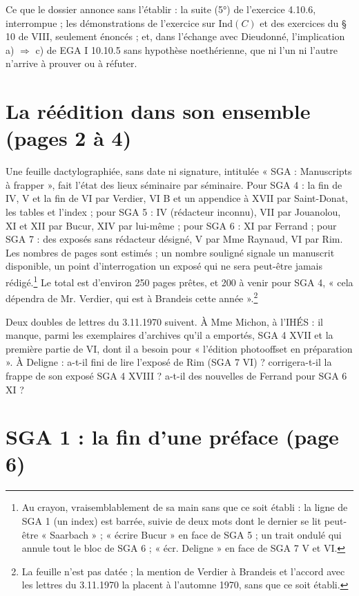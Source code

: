 \documentclass[11pt,a4paper]{article}
\begin{document}
Ce que le dossier annonce sans l'établir : la suite (5°) de l'exercice
4.10.6, interrompue ; les démonstrations de l'exercice sur $\mathrm{Ind}(C)$
et des exercices du § 10 de VIII, seulement énoncés ; et, dans l'échange avec
Dieudonné, l'implication a) $\Rightarrow$ c) de EGA I 10.10.5 sans hypothèse
noethérienne, que ni l'un ni l'autre n'arrive à prouver ou à réfuter.

\section*{La réédition dans son ensemble (pages 2 à 4)}

Une feuille dactylographiée, sans date ni signature, intitulée « SGA :
Manuscripts à frapper », fait l'état des lieux séminaire par séminaire. Pour
SGA 4 : la fin de IV, V et la fin de VI par Verdier, VI B et un appendice à
XVII par Saint-Donat, les tables et l'index ; pour SGA 5 : IV (rédacteur
inconnu), VII par Jouanolou, XI et XII par Bucur, XIV par lui-même ; pour
SGA 6 : XI par Ferrand ; pour SGA 7 : des exposés sans rédacteur désigné, V
par Mme Raynaud, VI par Rim. Les nombres de pages sont estimés ; un nombre
souligné signale un manuscrit disponible, un point d'interrogation un exposé
qui ne sera peut-être jamais rédigé.\footnote{Au crayon, vraisemblablement de
sa main sans que ce soit établi : la ligne de SGA 1 (un index) est barrée,
suivie de deux mots dont le dernier se lit peut-être « Saarbach » ; « écrire
Bucur » en face de SGA 5 ; un trait ondulé qui annule tout le bloc de SGA 6 ;
« écr. Deligne » en face de SGA 7 V et VI.}
Le total est d'environ 250 pages prêtes, et 200 à venir pour SGA 4,
« cela dépendra de Mr. Verdier, qui est à Brandeis cette année ».\footnote{La
feuille n'est pas datée ; la mention de Verdier à Brandeis et l'accord avec
les lettres du 3.11.1970 la placent à l'automne 1970, sans que ce soit
établi.}

Deux doubles de lettres du 3.11.1970 suivent. À Mme Michon, à l'IHÉS : il
manque, parmi les exemplaires d'archives qu'il a emportés, SGA 4 XVII et la
première partie de VI, dont il a besoin pour « l'édition photooffset en
préparation ». À Deligne : a-t-il fini de lire l'exposé de Rim (SGA 7 VI) ?
corrigera-t-il la frappe de son exposé SGA 4 XVIII ? a-t-il des nouvelles de
Ferrand pour SGA 6 XI ?

\section*{SGA 1 : la fin d'une préface (page 6)}
\end{document}
